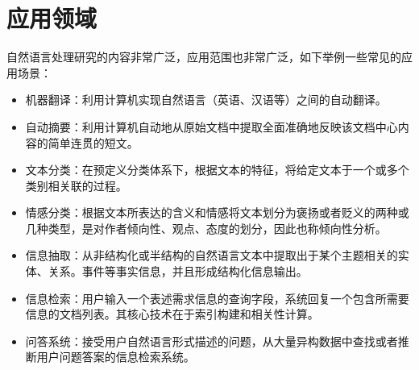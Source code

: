 \section{应用领域}
自然语言处理研究的内容非常广泛，应用范围也非常广泛，如下举例一些常见的应用场景：
\begin{itemize}
\item 机器翻译：利用计算机实现自然语言（英语、汉语等）之间的自动翻译。
\item 自动摘要：利用计算机自动地从原始文档中提取全面准确地反映该文档中心内容的简单连贯的短文。
\item 文本分类：在预定义分类体系下，根据文本的特征，将给定文本于一个或多个类别相关联的过程。
\item 情感分类：根据文本所表达的含义和情感将文本划分为褒扬或者贬义的两种或几种类型，是对作者倾向性、观点、态度的划分，因此也称倾向性分析。
\item 信息抽取：从非结构化或半结构的自然语言文本中提取出于某个主题相关的实体、关系。事件等事实信息，并且形成结构化信息输出。
\item 信息检索：用户输入一个表述需求信息的查询字段，系统回复一个包含所需要信息的文档列表。其核心技术在于索引构建和相关性计算。
\item 问答系统：接受用户自然语言形式描述的问题，从大量异构数据中查找或者推断用户问题答案的信息检索系统。
\end{itemize}


